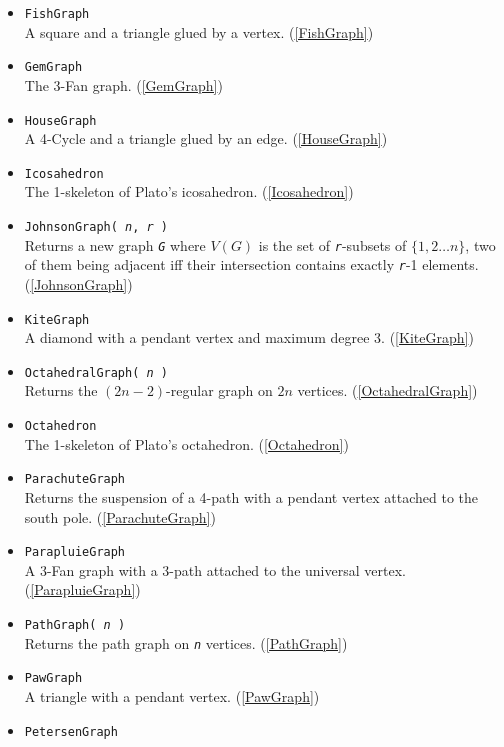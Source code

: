 \documentclass[a4paper,11pt]{report}
\begin{document}
{{\begin{itemize}
\item \texttt{FishGraph}\\
 A square and a triangle glued by a vertex. (\ref{FishGraph}) 
\item \texttt{GemGraph}\\
 The 3-Fan graph. (\ref{GemGraph}) 
\item \texttt{HouseGraph}\\
 A 4-Cycle and a triangle glued by an edge. (\ref{HouseGraph}) 
\item \texttt{Icosahedron}\\
 The 1-skeleton of Plato's icosahedron. (\ref{Icosahedron}) 
\item \texttt{JohnsonGraph( \mbox{\texttt{\mdseries\slshape n}}, \mbox{\texttt{\mdseries\slshape r}} )}\\
 Returns a new graph \mbox{\texttt{\mdseries\slshape G}} where $V(G)$ is the set of \mbox{\texttt{\mdseries\slshape r}}-subsets of $\{1,2 \ldots n\}$, two of them being adjacent iff their intersection contains exactly \mbox{\texttt{\mdseries\slshape r}}-1 elements. (\ref{JohnsonGraph}) 
\item \texttt{KiteGraph}\\
 A diamond with a pendant vertex and maximum degree 3. (\ref{KiteGraph}) 
\item \texttt{OctahedralGraph( \mbox{\texttt{\mdseries\slshape n}} )}\\
 Returns the $(2n-2)$-regular graph on $2n$ vertices. (\ref{OctahedralGraph}) 
\item \texttt{Octahedron}\\
 The 1-skeleton of Plato's octahedron. (\ref{Octahedron}) 
\item \texttt{ParachuteGraph}\\
 Returns the suspension of a 4-path with a pendant vertex attached to the south
pole. (\ref{ParachuteGraph}) 
\item \texttt{ParapluieGraph}\\
 A 3-Fan graph with a 3-path attached to the universal vertex. (\ref{ParapluieGraph}) 
\item \texttt{PathGraph( \mbox{\texttt{\mdseries\slshape n}} )}\\
 Returns the path graph on \mbox{\texttt{\mdseries\slshape n}} vertices. (\ref{PathGraph}) 
\item \texttt{PawGraph}\\
 A triangle with a pendant vertex. (\ref{PawGraph}) 
\item \texttt{PetersenGraph}\\

\end{itemize}}}
\end{document}

